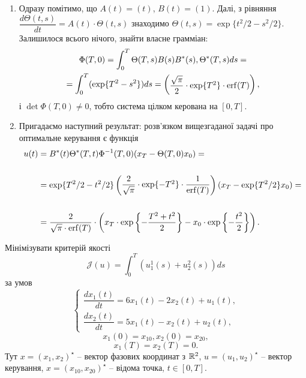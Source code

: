 \begin{solution}
\begin{enumerate}
    \item Одразу помітимо, що $A(t) = (t)$, $B(t) = (1)$. Далі, з рівняння $\dfrac{d\Theta(t,s)}{dt} = A(t) \cdot \Theta(t,s)$ знаходимо $\Theta(t,s) = \exp\{t^2 / 2 - s^2 / 2\}$. Залишилося всього нічого, знайти власне грамміан:
    \begin{multline*} \Phi(T,0) = \int_0^T \Theta(T,s)B(s)B^*(s),\Theta^*(T,s) ds = \\ = \int_0^T (\exp\{T^2 - s^2\}) ds = \begin{pmatrix}\dfrac{\sqrt \pi}{2} \cdot \exp\{T^2\} \cdot \operatorname{erf}(T) \end{pmatrix}, \end{multline*} і $\det\Phi(T,0)\ne0$, тобто система цілком керована на $[0, T]$.
    \item Пригадаємо наступний результат: розв'язком вищезгаданої задачі про оптимальне керування є функція
    \begin{align*}
        u(t) &= B^*(t) \Theta^*(T,t)\Phi^{-1}(T,0)(x_T-\Theta(T,0) x_0) = \\
        \\
        &= \exp\{T^2 / 2 - t^2 / 2\} \begin{pmatrix}\dfrac2{\sqrt \pi} \cdot \exp\{-T^2\} \cdot \dfrac1{\operatorname{erf}(T)} \end{pmatrix} (x_T - \exp\{T^2 / 2\} x_0) = \\
        \\
        &= \dfrac{2}{\sqrt{\pi}\cdot \operatorname{erf}(T)} \cdot \left(x_T \cdot \exp\left\{-\dfrac{T^2+t^2}2\right\} - x_0 \cdot \exp\left\{- \dfrac{t^2}2\right\}\right).
    \end{align*} 
\end{enumerate}
\end{solution} 

\begin{problem}
    Мінімізувати критерій якості 
    \[ \mathcal{J}(u) = \int_0^T (u_1^1(s) + u_2^2(s)) ds \]
    за умов \[ \left\{ \begin{aligned} \dfrac{dx_1(t)}{dt} = 6x_1(t) - 2x_2(t) + u_1(t), \\ \dfrac{dx_2(t)}{dt} = 5x_1(t) - x_2(t) + u_2(t), \end{aligned} \right. \]
    \[ x_1(0) = x_{10}, x_2(0) = x_{20}, \] 
    \[ x_1(T) = x_2(T) = 0. \]
    Тут $x = (x_1, x_2)^\star$ -- вектор фазових координат з $\mathbb{R}^2$, $u=(u_1,u_2)^\star$ -- вектор керування, $x = (x_{10}, x_{20})^\star$ -- відома точка, $t \in [0, T]$.
\end{problem}

